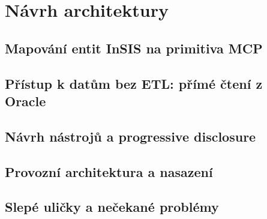 \chapter{Návrh architektury}
\label{ch:navrh}

\section{Mapování entit InSIS na primitiva MCP}

\section{Přístup k datům bez ETL: přímé čtení z Oracle}

\section{Návrh nástrojů a progressive disclosure}

\section{Provozní architektura a nasazení}

\section{Slepé uličky a nečekané problémy}
